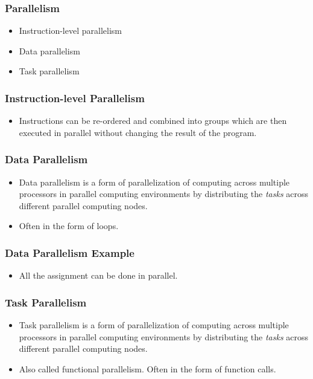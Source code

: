 \documentclass{beamer}
\begin{document}
\begin{CJK}{UTF8}{bsmi}
\begin{frame}
\frametitle{Parallelism} 
\begin{itemize}
\item Instruction-level parallelism
\item Data parallelism
\item Task parallelism
\end{itemize}
\end{frame}

\begin{frame}
\frametitle{Instruction-level Parallelism} 
\begin{itemize}
\item Instructions can be re-ordered and combined into groups which
  are then executed in parallel without changing the result of the
  program.
\end{itemize}
\end{frame}

\begin{frame}
\frametitle{Data Parallelism}
\begin{itemize}
\item Data parallelism is a form of parallelization of computing
  across multiple processors in parallel computing environments by
  distributing the {\em tasks} across different parallel computing
  nodes.
\item Often in the form of loops.
\end{itemize}
\end{frame}

\begin{frame}
\frametitle{Data Parallelism Example}
\begin{itemize}
\item All the assignment can be done in parallel.
\end{itemize}
\end{frame}

\begin{frame}
\frametitle{Task Parallelism} 
\begin{itemize}
\item Task parallelism is a form of parallelization of computing
  across multiple processors in parallel computing environments by
  distributing the {\em tasks} across different parallel computing
  nodes.
\item Also called functional parallelism.  Often in the form of
  function calls.
\end{itemize}
\end{frame}


\end{CJK}
\end{document}

